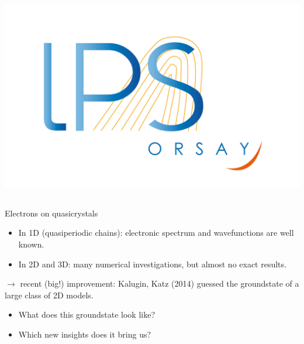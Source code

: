 \documentclass[xcolor=x11names,compress,professionalfonts]{beamer}
\renewcommand{\(}{\begin{columns}}
\renewcommand{\)}{\end{columns}}
\newcommand{\<}[1]{\begin{column}{#1}}
\renewcommand{\>}{\end{column}}
\begin{document}
\begin{frame}
\begin{columns}
\begin{column}{2cm}
~\\
~\\
\raggedleft
\includegraphics[scale=.15]{img/logo-lps.jpg}
\end{column}
\end{columns}
\end{frame}

\begin{frame}{Electrons on quasicrystals}
\begin{itemize}
	\item In 1D (quasiperiodic chains): electronic spectrum and wavefunctions are well known. 
	\item In 2D and 3D: many numerical investigations, but almost no exact results.
\end{itemize}
$\rightarrow$ recent (big!) improvement: Kalugin, Katz (2014) guessed the groundstate of a large class of 2D models.

\begin{itemize}
	\item What does this groundstate look like?
	\item Which new insights does it bring us?
\end{itemize} 
\end{frame}
\end{document}
